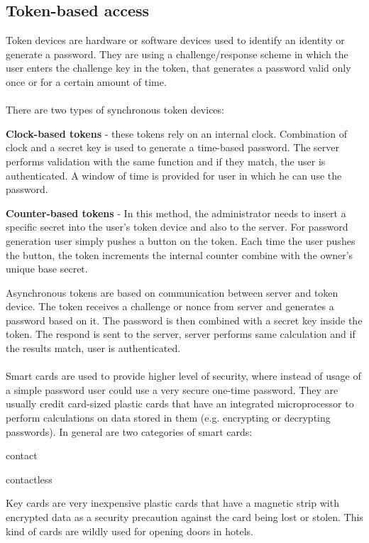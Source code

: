 \documentclass[twoside]{article}
\begin{document}
\begin{multicols}{2}
\section{Token-based access}

Token devices are hardware or software devices used to identify an identity or generate a password. They are using a challenge/response scheme in which the user enters the challenge key in the token, that generates a password valid only once or for a certain amount of time.\\\\
There are two types of synchronous token devices:
\begin{compactitem}
\item \textbf{Clock-based tokens} - these tokens rely on an internal clock. Combination of  clock and a secret key is used to generate a time-based password. The server performs validation with the same function and if they match, the user is authenticated. A window of time is provided for user in which he can use the password.
\item \textbf{Counter-based tokens} - In this method, the administrator needs to insert a specific secret into the user's token device and also to the server. For password generation user simply pushes a button on the token. Each time the user pushes the button, the token increments the internal counter combine with the owner's unique base secret. \end{compactitem}
Asynchronous tokens are based on communication between server and token device. The token receives a challenge or nonce from server and generates a password based on it. The 
password is then combined with a secret key inside the token. The respond is sent to the server, server performs same calculation and if the results match, user is authenticated.
\\\\
Smart cards are used to provide higher level of security, where instead of usage of a simple password user could use a very secure one-time password. They are usually credit card-sized plastic cards that have an integrated microprocessor to perform calculations on data stored in them (e.g. encrypting or decrypting passwords). In general are two
categories of smart cards: 
\begin{compactitem}
\item contact
\item contactless
\end{compactitem}
Key cards are very inexpensive plastic cards that have a magnetic strip
with encrypted data as a security precaution against the card being lost or stolen. This kind of cards are wildly used for opening doors in hotels.
 


\end{multicols}
\end{document}
